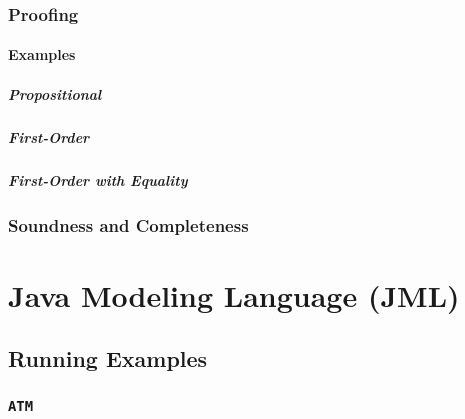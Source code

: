 \documentclass[a4paper, 11pt, accentcolor = tud3b]{tudreport}
\begin{document}
            \subsection{Proofing} %

                \subsubsection{Examples} %

                    \paragraph{Propositional} %

                    \paragraph{First-Order} %

                    \paragraph{First-Order with Equality} %

            \subsection{Soundness and Completeness} %

    \chapter{Java Modeling Language (JML)} %

        \section{Running Examples} %

            \subsection{\texttt{ATM}} %
\end{document}
